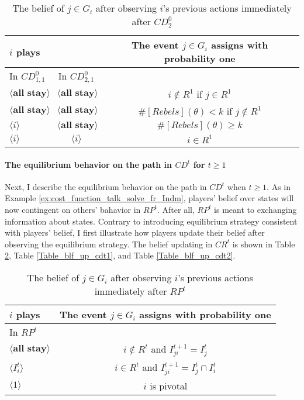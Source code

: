 \documentclass[12pt,letter]{article}
\theoremstyle{definition}
\theoremstyle{remark}
\theoremstyle{claim}
\begin{document}
\begin{table}[!htbp]
\caption{The belief of $j\in G_i$ after observing $i$'s previous actions immediately after $CD^0_{2}$}
\label{Table_blf_up_cd02}
\begin{center}
\begin{tabular}{l  c | c}
 	$i$ plays	  	&  	  &The event $j\in G_i$ assigns with probability one \\
\hline
\hline
	In $CD^0_{1,1}$		&			In $CD^0_{2,1}$	&  \\
\hline
  $\langle \textbf{all stay} \rangle$	&  $\langle \textbf{all stay} \rangle$ &  $i\notin R^1$ if $j\in R^1$ \\
  $\langle \textbf{all stay} \rangle$	&  $\langle \textbf{all stay} \rangle$ &  $\#[Rebels](\theta)< k$ if $j\notin R^1$\\
  $\langle i \rangle$	&	$\langle \textbf{all stay} \rangle$ &  $\#[Rebels](\theta)\geq k$    \\
  $\langle i \rangle$	&	$\langle i \rangle$ &  $i\in R^1$  \\
  \hline
\end{tabular}
\end{center}
\end{table}

\clearpage

\paragraph{The equilibrium behavior on the path in $CD^t$ for $t\geq 1$}
Next, I describe the equilibrium behavior on the path in $CD^t$ when $t\geq 1$. As in Example \ref{ex:cost_function_talk_solve_fr_Indm}, players' belief over states will now contingent on others' bahavior in $RP^t$. After all, $RP^t$ is meant to exchanging information about states. Contrary to introducing equilibrium strategy consistent with players' belief, I first illustrate how players update their belief after observing the equilibrium strategy. The belief updating in $CR^t$ is  shown in Table \ref{Table_blf_up_rpt}, Table \ref{Table_blf_up_cdt1}, and Table \ref{Table_blf_up_cdt2}.

\begin{table}[!htbp]
\caption{The belief of $j\in G_i$ after observing $i$'s previous actions immediately after $RP^t$ }
\label{Table_blf_up_rpt}
\begin{center}
\begin{tabular}{l | c}
 $i$ plays  		&	 The event $j\in G_i$ assigns with probability one \\
\hline
\hline
 In $RP^t$		&					 \\
\hline
$\langle \textbf{all stay} \rangle$  &     $i\notin R^t$ and $I^{t+1}_{ji}=I^t_j$ \\
$\langle I^t_{i} \rangle$  &     $i\in R^t$ and $I^{t+1}_{ji}=I^t_j\cap I^t_{i}$ \\
$\langle 1 \rangle$  & 	  $i$ is pivotal    \\
  \hline
\end{tabular}
\end{center}
\end{table}
\end{document}
